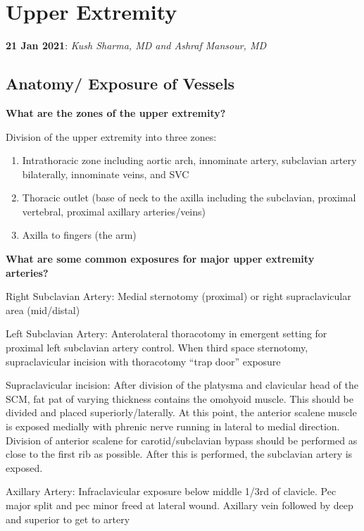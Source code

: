 \documentclass[
]{book}
\begin{document}
\hypertarget{upper-extremity}{%
\chapter{Upper Extremity}\label{upper-extremity}}

\textbf{21 Jan 2021}: \emph{Kush Sharma, MD and Ashraf Mansour, MD}

\hypertarget{anatomy-exposure-of-vessels}{%
\section{Anatomy/ Exposure of Vessels}\label{anatomy-exposure-of-vessels}}

\textbf{What are the zones of the upper extremity?} \citet{illig57UpperExtremity}

Division of the upper extremity into three zones:

\begin{enumerate}
\def\labelenumi{\arabic{enumi}.}
\item
  Intrathoracic zone including aortic arch, innominate artery,
  subclavian artery bilaterally, innominate veins, and SVC
\item
  Thoracic outlet (base of neck to the axilla including the
  subclavian, proximal vertebral, proximal axillary arteries/veins)
\item
  Axilla to fingers (the arm)
\end{enumerate}

\textbf{What are some common exposures for major upper extremity arteries?}

Right Subclavian Artery: Medial sternotomy (proximal) or right
supraclavicular area (mid/distal)

Left Subclavian Artery: Anterolateral thoracotomy in emergent setting
for proximal left subclavian artery control. When third space
sternotomy, supraclavicular incision with thoracotomy ``trap door''
exposure

Supraclavicular incision: After division of the platysma and clavicular
head of the SCM, fat pat of varying thickness contains the omohyoid
muscle. This should be divided and placed superiorly/laterally. At this
point, the anterior scalene muscle is exposed medially with phrenic
nerve running in lateral to medial direction. Division of anterior
scalene for carotid/subclavian bypass should be performed as close to
the first rib as possible. After this is performed, the subclavian
artery is exposed.

Axillary Artery: Infraclavicular exposure below middle 1/3rd of
clavicle. Pec major split and pec minor freed at lateral wound. Axillary
vein followed by deep and superior to get to artery
\end{document}
